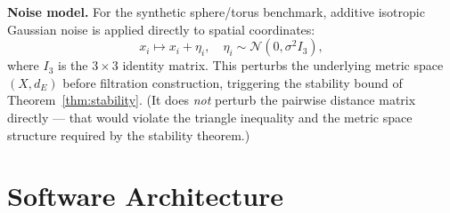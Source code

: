 \documentclass[12pt, a4paper]{report}
\theoremstyle{definition}
\theoremstyle{plain}
\theoremstyle{remark}
\begin{document}
\textbf{Noise model.} For the synthetic sphere/torus benchmark,
additive isotropic Gaussian noise is applied directly to spatial
coordinates:
\begin{equation}
  x_i \mapsto x_i + \eta_i, \quad \eta_i \sim \mathcal{N}(0,
  \sigma^2 I_3),
  \label{eq:noise}
\end{equation}
where $I_3$ is the $3 \times 3$ identity matrix. This perturbs the
underlying metric space $(X, d_E)$ before filtration construction,
triggering the stability bound of Theorem~\ref{thm:stability}. (It does
\emph{not} perturb the pairwise distance matrix directly --- that
would violate the triangle inequality and the metric space
structure required by the stability theorem.)

\section{Software Architecture}
\end{document}
